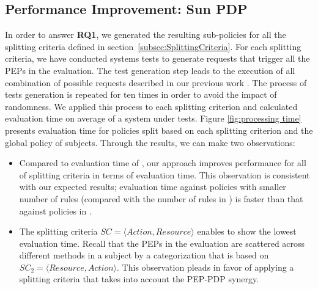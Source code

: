 \subsection{Performance Improvement: Sun PDP}\label{subsec:performanceimprovement}
In order to answer \textbf{RQ1}, we generated the resulting sub-policies for all the splitting criteria defined in 
section~\ref{subsec:SplittingCriteria}.
For each splitting criteria, we have conducted systems tests to generate requests that trigger all the PEPs in the evaluation. 
The test generation step leads to the execution of all combination of possible requests described in our previous work \cite{testcase}.  
The process of tests generation is repeated for ten times in order to avoid the impact of randomness.
We applied this process to each splitting criterion and calculated evaluation time on average of a system under tests.
Figure \ref{fig:processing time} presents evaluation time for policies split
based on each splitting criterion and the global policy of subjects. Through the results, we can make two observations:
\begin{itemize}
\item Compared to evaluation time of , our approach improves performance for all of splitting criteria
in terms of evaluation time. This observation is consistent with our expected results; evaluation time against
policies with smaller number of rules (compared with the number of rules in ) is faster than that against
policies in .
\item The splitting criteria \normalsize $SC=\langle Action, Resource\rangle$ enables to show the lowest evaluation time. 
Recall that the PEPs in the evaluation are scattered across different methods in a subject by a categorization 
that is based on $SC_{2}=\langle Resource,Action\rangle$. This observation pleads in favor of applying a splitting criteria 
that takes into account the PEP-PDP synergy.
\end{itemize}

